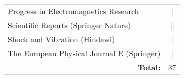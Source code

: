 \begin{center}
\begin{tabular}{l c}
		Progress in Electromagnetics Research                                   & |                   \\
		Scientific Reports (Springer Nature)                                    & ||                  \\
		Shock and Vibration (Hindawi)                                           & |                   \\
		The European Physical Journal E (Springer)                              & |                   \\
		\midrule
		\multicolumn{1}{r}{\textbf{Total:}}                                     & 37                  \\
		\bottomrule
	\end{tabular}
\end{center}

